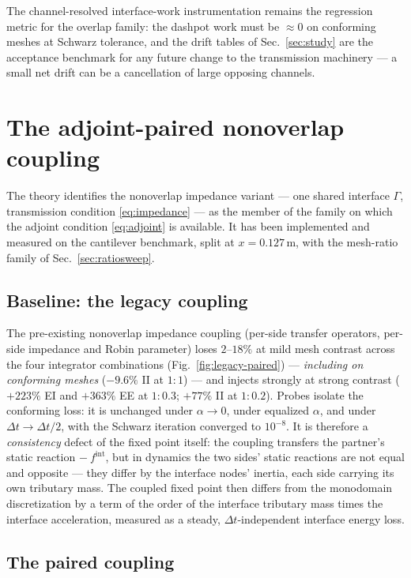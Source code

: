 \documentclass[11pt]{article}
\begin{document}
The channel-resolved interface-work instrumentation remains the regression
metric for the overlap family: the dashpot work must be $\approx 0$ on
conforming meshes at Schwarz tolerance, and the drift tables of
Sec.~\ref{sec:study} are the acceptance benchmark for any future change to
the transmission machinery --- a small net drift can be a cancellation of
large opposing channels.

\section{The adjoint-paired nonoverlap coupling}
\label{sec:paired}

The theory identifies the nonoverlap impedance variant --- one shared
interface $\Gamma$, transmission condition \eqref{eq:impedance} --- as
the member of the family on which the adjoint condition \eqref{eq:adjoint}
is available. It has been implemented and measured on the cantilever
benchmark, split at $x = 0.127$\,m, with the mesh-ratio family of
Sec.~\ref{sec:ratiosweep}.

\subsection{Baseline: the legacy coupling}
\label{sec:legacy}

The pre-existing nonoverlap impedance coupling (per-side transfer operators,
per-side impedance and Robin parameter) loses $2$--$18\%$ at mild mesh
contrast across the four integrator combinations
(Fig.~\ref{fig:legacy-paired}) --- \emph{including on conforming meshes}
($-9.6\%$ II at $1{:}1$) --- and injects strongly at strong contrast ($+223\%$ EI and $+363\%$ EE at
$1{:}0.3$; $+77\%$ II at $1{:}0.2$). Probes isolate the conforming loss: it
is unchanged under $\alpha \to 0$, under equalized $\alpha$, and under
$\Delta t \to \Delta t/2$, with the Schwarz iteration converged to
$10^{-8}$. It is therefore a \emph{consistency} defect of the fixed point
itself: the coupling transfers the partner's static reaction
$-~f^{\mathrm{int}}$, but in dynamics the two sides' static reactions are
not equal and opposite --- they differ by the interface nodes' inertia, each
side carrying its own tributary mass. The coupled fixed point then differs
from the monodomain discretization by a term of the order of the interface
tributary mass times the interface acceleration, measured as a steady,
$\Delta t$-independent interface energy loss.

\subsection{The paired coupling}
\label{sec:paired-coupling}
\end{document}
